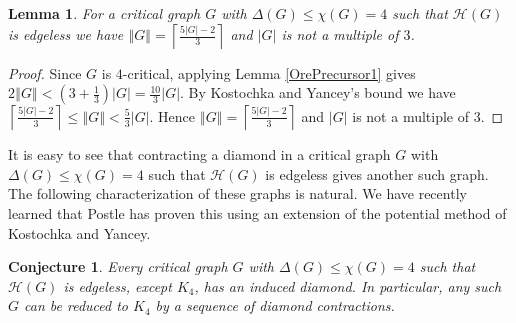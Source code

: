 \documentclass[12pt]{article}
\theoremstyle{plain}
\newtheorem{lem}[thm]{Lemma}
\newtheorem{conjecture}[thm]{Conjecture}
\theoremstyle{definition}
\theoremstyle{remark}
\newcommand{\fancy}[1]{\mathcal{#1}}
\newcommand{\HH}{\fancy{H}}
\newcommand{\card}[1]{\left|#1\right|}
\newcommand{\size}[1]{\left\Vert#1\right\Vert}
\newcommand{\ceil}[1]{\left\lceil#1\right\rceil}
\newcommand{\parens}[1]{\left( #1 \right)}
\begin{document}
\begin{lem}\label{EdgesIn4Critical}
For a critical graph $G$ with $\Delta(G) \leq \chi(G) = 4$ such that $\HH(G)$ is edgeless we have $\size{G} = \ceil{\frac{5\card{G} - 2}{3}}$ and $\card{G}$ is not a multiple of $3$.
\end{lem}
\begin{proof}
Since $G$ is $4$-critical, applying Lemma \ref{OrePrecursor1} gives $2\size{G} < \parens{3 + \frac13}\card{G} = \frac{10}{3}\card{G}$.  By Kostochka and Yancey's bound we have $\ceil{\frac{5\card{G}-2}{3}} \leq \size{G} < \frac{5}{3}\card{G}$.  Hence $\size{G} = \ceil{\frac{5\card{G} - 2}{3}}$ and $\card{G}$ is not a multiple of $3$.
\end{proof}

It is easy to see that contracting a diamond in a critical graph $G$ with $\Delta(G) \leq \chi(G) = 4$ such that $\HH(G)$ is edgeless gives another such graph.  The following characterization of these graphs is natural.  We have recently learned that Postle has proven this using an extension of the potential method of Kostochka and Yancey.

\begin{conjecture}\label{ContractionConjecture}
Every critical graph $G$ with $\Delta(G) \leq \chi(G) = 4$ such that $\HH(G)$ is edgeless, except $K_4$, has an induced diamond. In particular, any such $G$ can be reduced to $K_4$ by a sequence of diamond contractions.
\end{conjecture}
      


\end{document}
